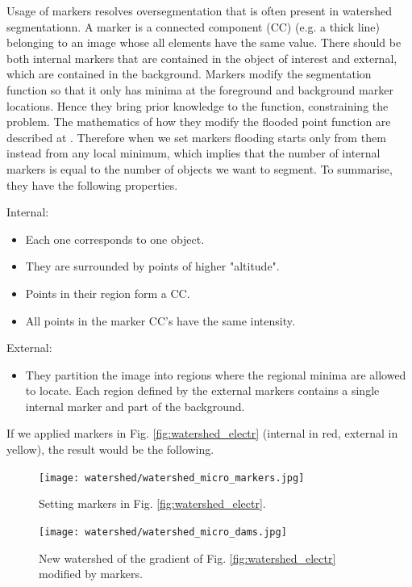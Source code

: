 \documentclass[a4paper]{article}
\begin{document}
Usage of markers resolves oversegmentation that is often present in watershed segmentationn. A marker is a connected component (CC) (e.g. a thick line) belonging to an image whose all elements have the same value. There should be both internal markers that are contained in the object of interest and external, which are  contained in the background.  Markers modify the segmentation function so that it only has minima at the foreground and background marker locations. Hence they bring prior knowledge to the function, constraining the problem. The mathematics of how they modify the flooded point function are described at \TODO[ref]. Therefore when we set markers flooding starts only from them instead from any local minimum, which implies that the number of internal markers is equal to the number of objects we want to segment. To summarise, they have the following properties.
\begin{multicols}{2}
Internal:
\begin{itemize}
	\item Each one corresponds to one object.
	\item They are surrounded by points of higher "altitude".
	\item Points in their region form a CC.
	\item All points in the marker CC's have the same intensity. 
\end{itemize}
\columnbreak
    External:
\begin{itemize}
	\item They partition the  image into regions where the regional minima are allowed to locate. Each region defined by the external markers contains a single internal marker and part of the background.
\end{itemize}
\end{multicols}

If we applied markers in Fig. \ref{fig:watershed_electr} (internal in red, external in yellow), the result would be the following.

\begin{multicols}{2}
\begin{figure}[H]
	\centering %
    	\texttt{[image: watershed/watershed\_micro\_markers.jpg]}
    \caption{Setting markers in Fig. \ref{fig:watershed_electr}.} 
\end{figure}
\columnbreak
\begin{figure}[H]
	\centering %
    	\texttt{[image: watershed/watershed\_micro\_dams.jpg]}
    \caption{New watershed of the gradient of Fig. \ref{fig:watershed_electr} modified by markers.} 
\end{figure}
\end{multicols}
\end{document}
